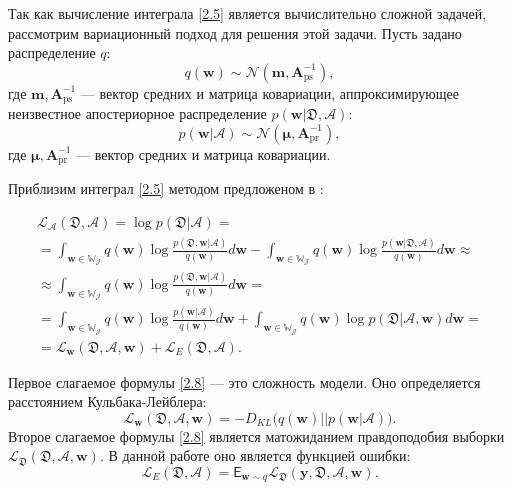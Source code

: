 Так как вычисление интеграла \eqref{2.5} является вычислительно сложной задачей, рассмотрим вариационный подход \cite{bishop2006} для решения этой задачи. Пусть задано распределение $q$:
\[
\label{2.6}
q(\textbf{w})\sim \mathcal{N}(\textbf{m}, \textbf{A}^{-1}_\text{ps}),
\]
где $\textbf{m}, \textbf{A}^{-1}_\text{ps}$ --- вектор средних и матрица ковариации, аппроксимирующее неизвестное апостериорное распределение $p(\textbf{w}|\mathfrak{D},\mathcal{A})$:
\[
\label{2.7}
p(\textbf{w} | \mathcal{A})\sim \mathcal{N}(\boldsymbol{\mu},\textbf{A}^{-1}_{\text{pr}}),
\]
где $\boldsymbol{\mu},\textbf{A}^{-1}_{\text{pr}}$ --- вектор средних и матрица ковариации.

Приблизим интеграл \eqref{2.5} методом предложеном в \cite{bishop2006}:

\[
\label{2.8}
\begin{aligned}
\mathcal{L}_{\mathcal{A}}(\mathfrak{D},\mathcal{A}) = \log p(\mathfrak{D}|\mathcal{A}) = \\
=\int_{\textbf{w}\in\mathbb{W_\mathcal{J}}} q(\textbf{w}) \log \frac{p(\mathfrak{D}, \textbf{w}|\mathcal{A})}{q(\textbf{w})}d \textbf{w} - \int_{\textbf{w}\in\mathbb{W_\mathcal{J}}}  q(\textbf{w}) \log \frac{p(\textbf{w}|\mathfrak{D},\mathcal{A})}{q(\textbf{w})}d \textbf{w} \approx \\
\approx \int_{\textbf{w}\in\mathbb{W_\mathcal{J}}} q(\textbf{w}) \log \frac{p(\mathfrak{D}, \textbf{w}|\mathcal{A})}{q(\textbf{w})}d \textbf{w} = \\
= \int_{\textbf{w}\in\mathbb{W_\mathcal{J}}} q(\textbf{w}) \log \frac{p(\textbf{w}| \mathcal{A})}{q(\textbf{w})}d \textbf{w} + \int_{\textbf{w}\in\mathbb{W_\mathcal{J}}} q(\textbf{w}) \log p(\mathfrak{D}|\mathcal{A}, \textbf{w})d \textbf{w}=\\
=\mathcal{L}_\textbf{w}(\mathfrak{D}, \mathcal{A}, \textbf{w})+\mathcal{L}_{E}(\mathfrak{D},\mathcal{A}).
\end{aligned}
\]

Первое слагаемое формулы \eqref{2.8} --- это сложность модели. Оно определяется расстоянием Кульбака-Лейблера:
\[
\label{2.9}
\mathcal{L}_\textbf{w}(\mathfrak{D}, \mathcal{A}, \textbf{w}) = -D_{KL}\bigl(q(\textbf{w})||p(\textbf{w}|\mathcal{A})\bigr).
\]
Второе слагаемое формулы \eqref{2.8} является матожиданием правдоподобия выборки $\mathcal{L}_\mathfrak{D}(\mathfrak{D},\mathcal{A}, \textbf{w})$. В данной работе оно является функцией ошибки:
\[
\label{2.10}
\mathcal{L}_{E}(\mathfrak{D},\mathcal{A}) = \mathsf{E}_{\textbf{w}\sim q}\mathcal{L}_\mathfrak{D}(\textbf{y}, \mathfrak{D}, \mathcal{A}, \textbf{w}).
\]

